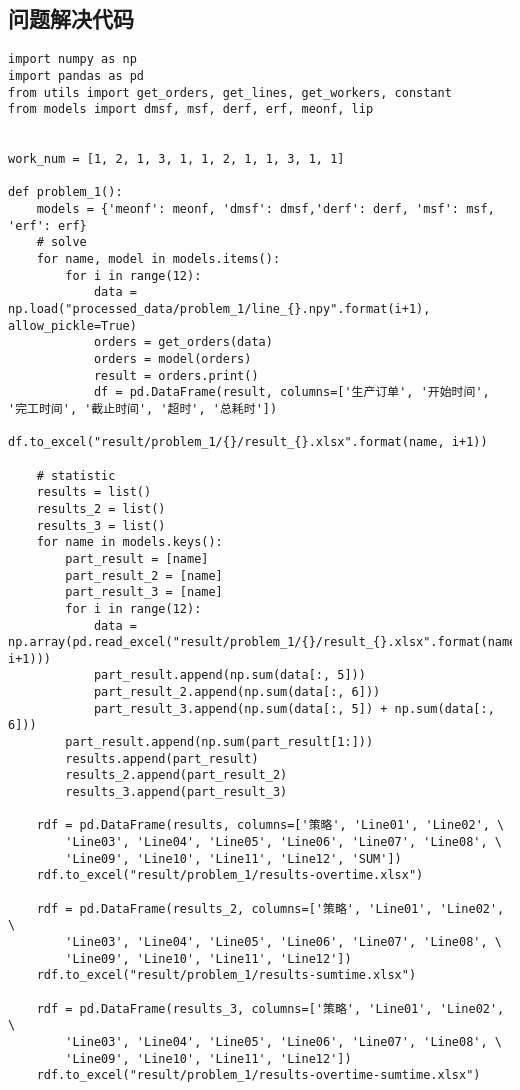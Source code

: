 \subsection{问题解决代码}
\begin{lstlisting}[caption={问题解决}, label={lst:python}]
import numpy as np
import pandas as pd
from utils import get_orders, get_lines, get_workers, constant
from models import dmsf, msf, derf, erf, meonf, lip


work_num = [1, 2, 1, 3, 1, 1, 2, 1, 1, 3, 1, 1]

def problem_1():
    models = {'meonf': meonf, 'dmsf': dmsf,'derf': derf, 'msf': msf, 'erf': erf}
    # solve 
    for name, model in models.items():
        for i in range(12):
            data = np.load("processed_data/problem_1/line_{}.npy".format(i+1), allow_pickle=True)
            orders = get_orders(data)
            orders = model(orders)
            result = orders.print()
            df = pd.DataFrame(result, columns=['生产订单', '开始时间', '完工时间', '截止时间', '超时', '总耗时'])
            df.to_excel("result/problem_1/{}/result_{}.xlsx".format(name, i+1))
    
    # statistic
    results = list()
    results_2 = list()
    results_3 = list()
    for name in models.keys():
        part_result = [name]
        part_result_2 = [name]
        part_result_3 = [name]
        for i in range(12):
            data = np.array(pd.read_excel("result/problem_1/{}/result_{}.xlsx".format(name, i+1)))
            part_result.append(np.sum(data[:, 5]))
            part_result_2.append(np.sum(data[:, 6]))
            part_result_3.append(np.sum(data[:, 5]) + np.sum(data[:, 6]))
        part_result.append(np.sum(part_result[1:]))
        results.append(part_result)
        results_2.append(part_result_2)
        results_3.append(part_result_3)
        
    rdf = pd.DataFrame(results, columns=['策略', 'Line01', 'Line02', \
        'Line03', 'Line04', 'Line05', 'Line06', 'Line07', 'Line08', \
        'Line09', 'Line10', 'Line11', 'Line12', 'SUM'])
    rdf.to_excel("result/problem_1/results-overtime.xlsx")

    rdf = pd.DataFrame(results_2, columns=['策略', 'Line01', 'Line02', \
        'Line03', 'Line04', 'Line05', 'Line06', 'Line07', 'Line08', \
        'Line09', 'Line10', 'Line11', 'Line12'])
    rdf.to_excel("result/problem_1/results-sumtime.xlsx")
       
    rdf = pd.DataFrame(results_3, columns=['策略', 'Line01', 'Line02', \
        'Line03', 'Line04', 'Line05', 'Line06', 'Line07', 'Line08', \
        'Line09', 'Line10', 'Line11', 'Line12'])
    rdf.to_excel("result/problem_1/results-overtime-sumtime.xlsx")



\end{lstlisting}
